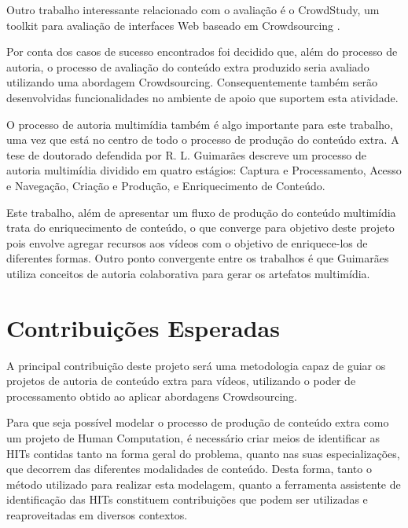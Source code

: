 \documentclass{sig-alternate}
\begin{document}
Outro trabalho interessante relacionado com o avaliação é o CrowdStudy, um toolkit para avaliação de interfaces Web baseado em Crowdsourcing \cite{Nebeling}.

Por conta dos casos de sucesso encontrados foi decidido que, além do processo de autoria, o processo de avaliação do conteúdo extra produzido seria avaliado utilizando uma abordagem Crowdsourcing. Consequentemente também serão desenvolvidas funcionalidades no ambiente de apoio que suportem esta atividade.



O processo de autoria multimídia também é algo importante para este trabalho, uma vez que está no centro de todo o processo de produção do conteúdo extra. A tese de doutorado defendida por R. L. Guimarães \cite{22334} descreve um processo de autoria multimídia dividido em quatro estágios: Captura e Processamento, Acesso e Navegação, Criação e Produção, e Enriquecimento de Conteúdo. 

Este trabalho, além de apresentar um fluxo de produção do conteúdo multimídia trata do enriquecimento de conteúdo, o que converge para  objetivo deste projeto  pois envolve agregar recursos aos vídeos com o objetivo de enriquece-los de diferentes formas. Outro ponto convergente entre os trabalhos é que Guimarães \cite{22334} utiliza conceitos de autoria colaborativa para gerar os artefatos multimídia.





\section{Contribuições Esperadas}

\par A principal contribuição deste projeto será uma metodologia capaz de guiar os projetos de autoria de conteúdo extra para vídeos, utilizando o poder de processamento obtido ao aplicar abordagens Crowdsourcing. 

Para que seja possível modelar o processo de produção de conteúdo extra como um projeto de Human Computation, é necessário criar meios de identificar as HITs contidas tanto na forma geral do problema, quanto nas suas especializações, que decorrem das diferentes modalidades de conteúdo. Desta forma, tanto o método utilizado para realizar esta modelagem, quanto a ferramenta assistente de identificação das HITs constituem contribuições que podem ser utilizadas e reaproveitadas em diversos contextos.
\end{document}
